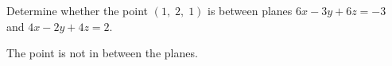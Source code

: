 
\begin{Exercise}[
name={},
title={}, 
difficulty=0,
origin={\cite{BS}}]
Determine whether the point $(1,\; 2,\; 1)$ is between planes $6x - 3y + 6z = -3$ and $4x - 2y + 4z = 2$.
\end{Exercise}
\begin{Answer}
The point is not in between the planes.
\end{Answer}
